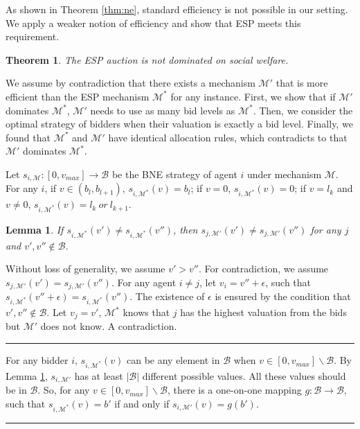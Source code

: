 \documentclass[letterpaper]{article}
\newtheorem{theorem}{Theorem}%
\newenvironment{proof}{{Proof:}}{\hfill\rule{2mm}{2mm}}
\newtheorem{lemma}{Lemma}
\begin{document}
As shown in Theorem \ref{thm:ne}, standard efficiency is not possible in our setting. We apply a weaker notion of efficiency and show that ESP meets this requirement.
\begin{theorem}\label{thm:exp}
	The ESP auction is not dominated on social welfare.
\end{theorem}
\begin{proof}
	We assume by contradiction that there exists a mechanism $\mathcal{M'}$ that is more efficient than the ESP mechanism $\mathcal{M^*}$ for any instance. First, we show that if $\mathcal{M'}$ dominates $\mathcal{M^*}$, $\mathcal{M'}$ needs to use as many bid levels as $\mathcal{M^*}$. Then, we consider the optimal strategy of bidders when their valuation is exactly a bid level. Finally, we found that $\mathcal{M^*}$ and $\mathcal{M'}$ have identical allocation rules, which contradicts to that $\mathcal{M'}$ dominates $\mathcal{M^*}$.
	
	Let $s_{i,\mathcal{M}}: [0,v_{max}]\rightarrow \mathcal{B}$ be the BNE strategy of agent $i$ under mechanism $\mathcal{M}$. For any $i$, if $v\in(b_l,b_{l+1})$, $s_{i,\mathcal{M^*}}(v)=b_l$; if $v=0$, $s_{i,\mathcal{M^*}}(v)=0$; if $v=l_k$ and $v\neq 0$, $s_{i,\mathcal{M^*}}(v)=l_k~or~l_{k+1}$.

	
	\begin{lemma}\label{lmm:dif}
		If $s_{i,\mathcal{M^*}}(v')\neq s_{i,\mathcal{M^*}}(v'')$, then $s_{j,\mathcal{M'}}(v')\neq s_{j,\mathcal{M'}}(v'')$ for any $j$ and $v',v''\notin \mathcal{B}$.
	\end{lemma}
	\begin{proof}
		Without loss of generality, we assume $v'>v''$.  For contradiction, we assume $s_{j,\mathcal{M'}}(v')= s_{j,\mathcal{M'}}(v'')$. 
		For any agent $i\neq j$, let $v_i=v''+\epsilon$, such that $s_{i,\mathcal{M^*}}(v''+\epsilon)= s_{i,\mathcal{M^*}}(v'')$.
		The existence of $\epsilon$ is ensured by the condition that $v',v''\notin \mathcal{B}$.
		Let $v_j=v'$, $\mathcal{M^*}$ knows that $j$ has the highest valuation from the bids but $\mathcal{M'}$ does not know.
		A contradiction.
	\end{proof}
	
	For any bidder $i$, $s_{i,\mathcal{M^*}}(v)$ can be any element in $\mathcal{B}$ when $v\in[0,v_{max}]\backslash \mathcal{B}$. By Lemma \ref{lmm:dif}, $s_{i,\mathcal{M'}}$ has at least $|\mathcal{B}|$ different possible values.
	All these values should be in $\mathcal{B}$. So, for any $v\in[0,v_{max}]\backslash \mathcal{B}$, there is a one-on-one mapping $g:\mathcal{B}\rightarrow\mathcal{B}$, such that $s_{i,\mathcal{M^*}}(v)=b'$ if and only if $s_{i,\mathcal{M'}}(v)=g(b')$.
	

\end{proof}
\end{document}
